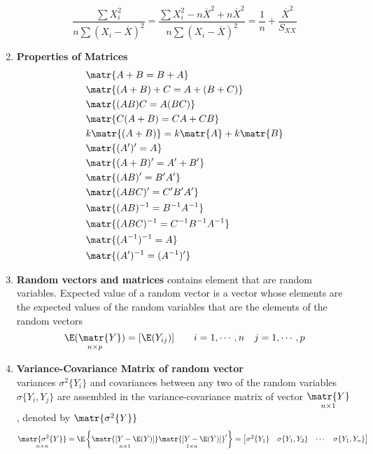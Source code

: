 \documentclass[11pt]{article}
\begin{document}
\begin{defn*}
\begin{enumerate}
\[            \frac{\sum X_i^2}{n \sum (X_i - \overline{X})^2} =
            \frac{\sum X_i^2 - n\overline{X}^2 + n\overline{X}^2}{n\sum (X_i - \overline{X})^2} = 
            \frac{1}{n} + \frac{\overline{X}^2}{S_{XX}}
        \]
        \item \textbf{Properties of Matrices}
        \begin{align*}
            &\matr{A + B = B + A} \\
            &\matr{(A+B)+C = A + (B+C)} \\
            &\matr{(AB)C = A(BC)} \\
            &\matr{C(A+B) = CA + CB} \\
            &k\matr{(A+B)} = k\matr{A} + k\matr{B} \\
            &\matr{(A')' = A} \\
            &\matr{(A+B)' = A' + B'} \\
            &\matr{(AB)' = B'A'} \\
            &\matr{(ABC)' = C'B'A'} \\
            &\matr{(AB)^{-1} = B^{-1}A^{-1}} \\
            &\matr{(ABC)^{-1} = C^{-1}B^{-1}A^{-1}} \\
            &\matr{(A^{-1})^{-1} = A} \\
            &\matr{(A')^{-1} = (A^{-1})'} \\ 
        \end{align*}
        \item \textbf{Random vectors and matrices} contains element that are random variables. Expected value of a random vector is a vector whose elements are the expected values of the random variables that are the elements of the random vectors 
        \[
            \underset{n\times p}{\E(\matr{Y})} = [ \E(Y_{ij}) ] \quad \quad i = 1,\cdots, n \quad j = 1, \cdots, p
        \]
        \item \textbf{Variance-Covariance Matrix of random vector} \\
        variances $\sigma^2\{ Y_i \}$ and covariances between any two of the random variables $\sigma\{ Y_i, Y_j\}$ are assembled in the variance-covariance matrix of vector $\underset{n\times 1}{\matr{Y}}$, denoted by $\matr{\sigma^2\{Y\}}$
        \[
            \underset{n\times n}{\matr{\sigma^2\{ Y \}}} =
            \E \left\{ \underset{n\times 1}{\matr{[Y - \E(Y)]}} \underset{1\times n}{\matr{[Y - \E(Y)]}}'  \right\} =
            \begin{bmatrix}
                \sigma^2\{Y_1 \} & \sigma\{ Y_1, Y_2 \} & \cdots & \sigma\{ Y_1, Y_n \} \\

\end{bmatrix}\]
\end{enumerate}
\end{defn*}
\end{document}
